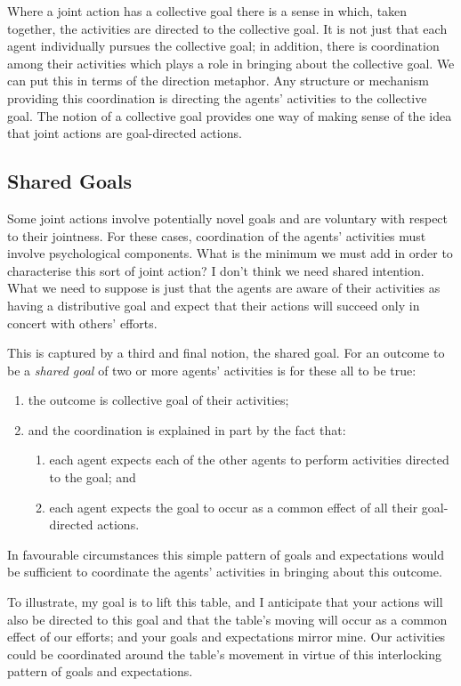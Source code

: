 \documentclass[12pt,a4paper]{extarticle}
\begin{document}
Where a joint action has a collective goal there is a sense in which, taken together, the activities are directed to the collective goal.  It is not just that each agent individually pursues the collective goal; in addition, there is coordination among their activities which plays a role in bringing about the collective goal.  We can put this in terms of the direction metaphor.  Any structure or mechanism providing this coordination is directing the agents' activities to the collective goal.  The notion of a collective goal provides one way of making sense of the idea that joint actions are goal-directed actions.

\subsection{Shared Goals}

Some joint actions involve potentially novel goals and are voluntary with respect to their jointness.
For these cases, coordination of the agents' activities must involve psychological components.
What is the minimum we must add in order to characterise this sort of joint action?
I don't think we need shared intention.
What we need to suppose is just that the agents are aware of their activities as having a distributive goal and expect that their actions will succeed only in concert with others' efforts.

This is captured by a third and final notion, the shared goal.
For an outcome to be a \emph{shared goal} of two or more agents' activities is for these all to be true:
\begin{enumerate}
\item the outcome is collective goal of their activities;
\item and the coordination is explained in part by the fact that:
\begin{enumerate}
\item each agent expects each of the other agents to perform activities directed to the goal; and
\item each agent expects the goal to occur as a common effect of all their goal-directed actions.
\end{enumerate}
\end{enumerate}
%
In favourable circumstances this simple pattern of goals and expectations would be sufficient to coordinate the agents’ activities in bringing about this outcome. 

To illustrate, my goal is to lift this table, and I anticipate that your actions will also be directed to this goal and that the table's moving will occur as a common effect of our efforts; and your goals and expectations mirror mine.
Our activities could be coordinated around the table's movement in virtue of this interlocking pattern of goals and expectations. 
\end{document}
